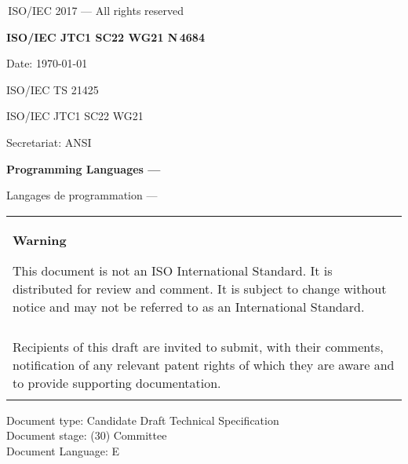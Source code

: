 

\thispagestyle{empty}
{\raisebox{.35ex}{\smaller\copyright}}\,ISO/IEC 2017 --- All rights reserved
\vspace{2ex}

\begin{flushright}
\textbf{ISO/IEC JTC1 SC22 WG21 N\,\LARGE4684}

Date: \today

ISO/IEC TS 21425

ISO/IEC JTC1 SC22 WG21

Secretariat: ANSI

\end{flushright}

\vfill

\textbf{\LARGE Programming Languages --- \doctitle}

Langages de programmation --- \frtitle

\vfill

\begin{tabular}{|p{\hsize}|}
\hline
\begin{center}
\textbf{Warning}
\end{center}

\vspace{2ex}

This document is not an ISO International Standard. It is distributed
for review and comment. It is subject to change without notice and may
not be referred to as an International Standard.\\\\

Recipients of this draft are invited to submit, with their comments,
notification of any relevant patent rights of which they are aware
and to provide supporting documentation.\\\\
\hline
\end{tabular}

\vfill
\noindent
Document type: Candidate Draft Technical Specification\\
Document stage: (30) Committee\\
Document Language: E
\pagebreak

\thispagestyle{cpppage}

